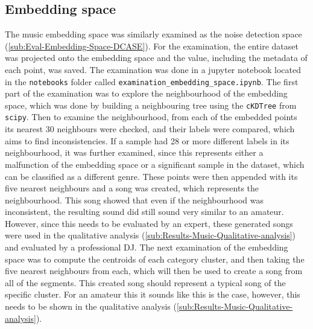 \subsection{Embedding space}
\label{sub:Results-Music-Embedding-Space}
The music embedding space was similarly examined as the noise detection space (\ref{sub:Eval-Embedding-Space-DCASE}). For the examination, the entire dataset was projected onto the embedding space and the value, including the metadata of each point, was saved. The examination was done in a jupyter notebook located in the \texttt{notebooks} folder called \texttt{examination\_embedding\_space.ipynb}.
\newline
\newline
The first part of the examination was to explore the neighbourhood of the embedding space, which was done by building a neighbouring tree using the \texttt{cKDTree} from \texttt{scipy}. Then to examine the neighbourhood, from each of the embedded points its nearest 30 neighbours were checked, and their labels were compared, which aims to find inconsistencies. If a sample had 28 or more different labels in its neighbourhood, it was further examined, since this represents either a malfunction of the embedding space or a significant sample in the dataset, which can be classified as a different genre. These points were then appended with its five nearest neighbours and a song was created, which represents the neighbourhood. This song showed that even if the neighbourhood was inconsistent, the resulting sound did still sound very similar to an amateur. However, since this needs to be evaluated by an expert, these generated songs were used in the qualitative analysis (\ref{sub:Results-Music-Qualitative-analysis}) and evaluated by a professional DJ.
\newline
\newline
The next examination of the embedding space was to compute the centroids of each category cluster, and then taking the five nearest neighbours from each, which will then be used to create a song from all of the segments. This created song should represent a typical song of the specific cluster. For an amateur this it sounds like this is the case, however, this needs to be shown in the qualitative analysis (\ref{sub:Results-Music-Qualitative-analysis}).
\newline
\newline
